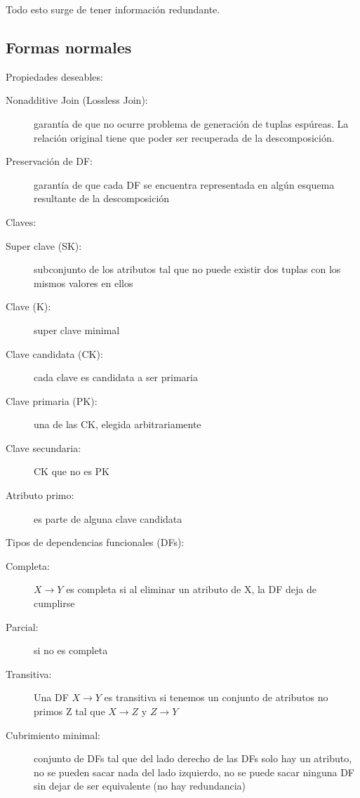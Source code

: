 Todo esto surge de tener información redundante.

\subsection{Formas normales}

Propiedades deseables:

\begin{description}
	\item[Nonadditive Join (Lossless Join):] garantía de que no ocurre problema de generación de tuplas espúreas. La relación original tiene que poder ser recuperada de la descomposición.
	\item[Preservación de DF:] garantía de que cada DF se encuentra representada en algún esquema resultante de la descomposición
\end{description}

Claves:

\begin{description}
	\item[Super clave (SK):] subconjunto de los atributos tal que no puede existir dos tuplas con los mismos valores en ellos
	\item[Clave (K):] super clave minimal
	\item[Clave candidata (CK):] cada clave es candidata a ser primaria
	\item[Clave primaria (PK):] una de las CK, elegida arbitrariamente
	\item[Clave secundaria:] CK que no es PK
	\item[Atributo primo:] es parte de alguna clave candidata
\end{description}

Tipos de dependencias funcionales (DFs):

\begin{description}
	\item[Completa:] $X \to Y$ es completa si al eliminar un atributo de X, la DF deja de cumplirse
	\item[Parcial:] si no es completa
	\item[Transitiva:] Una DF $X \to Y$ es transitiva si tenemos un conjunto de atributos no primos Z tal que $X \to Z$ y $Z \to Y$
	\item[Cubrimiento minimal:] conjunto de DFs tal que del lado derecho de las DFs solo hay un atributo, no se pueden sacar nada del lado izquierdo, no se puede sacar ninguna DF sin dejar de ser equivalente (no hay redundancia)
\end{description}

